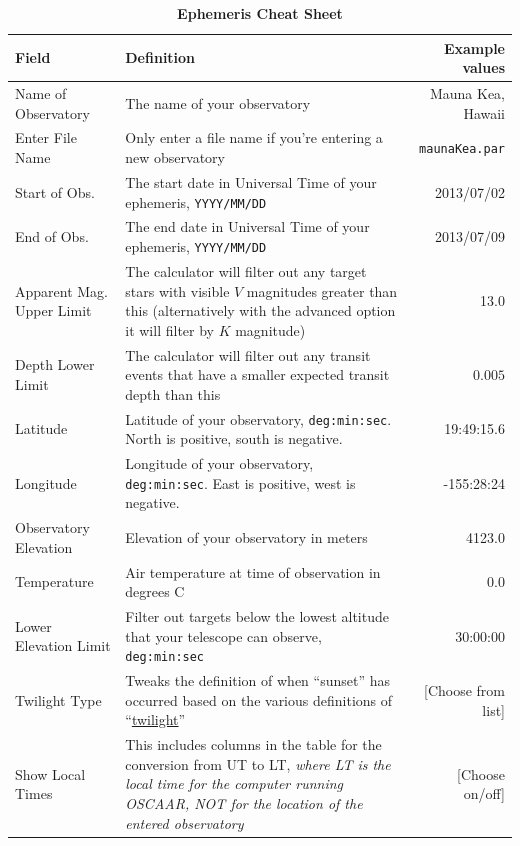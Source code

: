 \documentclass[a4paper]{article}
\newcommand{\code}[1]{\texttt{#1}}
\begin{document}
\pagebreak
\begin{table}[H]
\renewcommand{\arraystretch}{1.5}
\centering
\caption{\textbf{Ephemeris Cheat Sheet}}
\begin{tabular}{p{0.8in} |  p{3.2in} r}
Field & Definition & Example values\\
\hline\hline
Name of Observatory & The name of your observatory & Mauna Kea, Hawaii\\
Enter File Name & Only enter a file name if you're entering a new observatory & \code{maunaKea.par}\\
Start of Obs. & The start date in Universal Time of your ephemeris, \code{YYYY/MM/DD} & 2013/07/02\\
End of Obs. & The end date in Universal Time of your ephemeris, \code{YYYY/MM/DD} &  2013/07/09\\
Apparent Mag. Upper Limit & The calculator will filter out any target stars with visible $V$ magnitudes greater than this (alternatively with the advanced option it will filter by $K$ magnitude) & 13.0\\
Depth Lower Limit & The calculator will filter out any transit events that have a smaller expected transit depth than this& $0.005$\\
\hline 
Latitude & Latitude of your observatory, \code{deg:min:sec}. North is positive, south is negative. & 19:49:15.6\\
Longitude & Longitude of your observatory, \code{deg:min:sec}. East is positive, west is negative. & -155:28:24\\
Observatory Elevation & Elevation of your observatory in meters & 4123.0 \\
Temperature & Air temperature at time of observation in degrees C & 0.0 \\
Lower Elevation Limit & Filter out targets below the lowest altitude that your telescope can observe, \code{deg:min:sec} & 30:00:00 \\
Twilight Type & Tweaks the definition of when ``sunset'' has occurred based on the various definitions of ``\href{http://en.wikipedia.org/wiki/Twilight#Definitions}{twilight}'' & [Choose from list] \\
Show Local Times & This includes columns in the table for the conversion from UT to LT, \textit{where LT is the local time for the computer running OSCAAR, NOT for the location of the entered observatory} & [Choose on/off] \\

\end{tabular}
\end{table}
\end{document}
